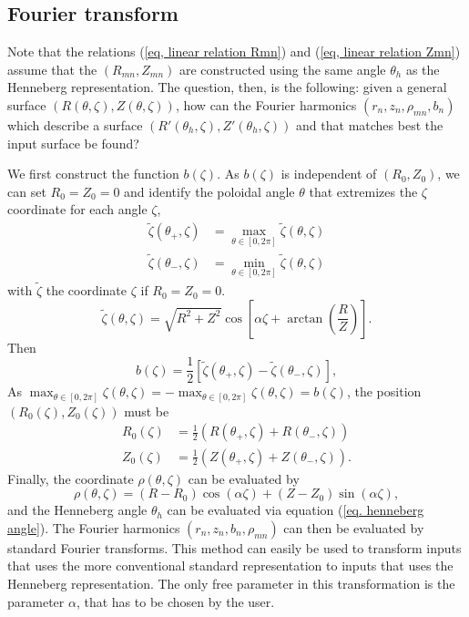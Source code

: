 \documentclass[my_thesis.tex]{subfiles}
\begin{document}
\subsection{Fourier transform}
Note that the relations (\ref{eq, linear relation Rmn}) and (\ref{eq, linear relation Zmn}) assume that the $(R_{mn},Z_{mn})$ are constructed using the same angle $\theta_h$ as the Henneberg representation. The question, then, is the following: given a general surface $(R(\theta,\zeta),Z(\theta,\zeta))$, how can the Fourier harmonics $(r_n,z_n,\rho_{mn},b_n)$ which describe a surface $(R'(\theta_h,\zeta),Z'(\theta_h,\zeta))$ and that matches best the input surface be found?

We first construct the function $b(\zeta)$. As $b(\zeta)$ is independent of $(R_0,Z_0)$, we can set $R_0=Z_0=0$ and identify the poloidal angle $\theta$ that extremizes the $\zeta$ coordinate for each angle $\zeta$,
\begin{align}
	\tilde\zeta(\theta_+,\zeta) &= \max_{\theta\in[0,2\pi]}\tilde\zeta(\theta,\zeta)\\
	\tilde\zeta(\theta_-,\zeta) &= \min_{\theta\in[0,2\pi]}\tilde\zeta(\theta,\zeta)
\end{align}
with $\tilde\zeta$ the coordinate $\zeta$ if $R_0=Z_0=0$.
\begin{equation}
	\tilde\zeta(\theta,\zeta) = \sqrt{R^2+Z^2}\cos\left[\alpha\zeta+\arctan\left(\frac{R}{Z}\right)\right].
\end{equation}
Then
\begin{equation}
	b(\zeta) = \frac{1}{2}\left[\tilde\zeta(\theta_+,\zeta)-\tilde\zeta(\theta_-,\zeta)\right],
\end{equation}
As $\max_{\theta\in[0,2\pi]}\zeta(\theta,\zeta)=-\max_{\theta\in[0,2\pi]}\zeta(\theta,\zeta)=b(\zeta)$, the position $(R_0(\zeta),Z_0(\zeta))$ must be 
\begin{align}
	R_0(\zeta) &= \frac{1}{2}\left(R(\theta_+,\zeta)+R(\theta_-,\zeta)\right)\\
	Z_0(\zeta) &= \frac{1}{2}\left(Z(\theta_+,\zeta)+Z(\theta_-,\zeta)\right).
\end{align}
Finally, the coordinate $\rho(\theta,\zeta)$ can be evaluated by
\begin{equation}
	\rho(\theta,\zeta) = (R-R_0)\cos(\alpha\zeta) + (Z-Z_0)\sin(\alpha\zeta),
\end{equation}
and the Henneberg angle $\theta_h$ can be evaluated via equation (\ref{eq. henneberg angle}). The Fourier harmonics $(r_n,z_n,b_n,\rho_{mn})$ can then be evaluated by standard Fourier transforms. This method can easily be used to transform inputs that uses the more conventional standard representation to inputs that uses the Henneberg representation. The only free parameter in this transformation is the parameter $\alpha$, that has to be chosen by the user. 
\end{document}
